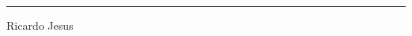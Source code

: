 \documentclass[10pt,landscape]{article}
\makeatletter
\renewcommand{\subsection}{\@startsection{subsection}{2}{0mm}%
                                {-1explus -.5ex minus -.2ex}%
                                {0.5ex plus .2ex}%
                                {\normalfont\normalsize\bfseries}}
\makeatother
\begin{document}
\begin{multicols}{3}
\iffalse
\subsection{Integrais de Funções Hiperbólicas}

$\int \cosh ax\ dx =\frac{1}{a} \sinh ax$\\
$\int \sinh ax\ dx = \frac{1}{a} \cosh ax$\\
$\int  \tanh ax\hspace{1.5pt} dx =\frac{1}{a} \ln \cosh ax$\\
\fi
\rule{0.7\linewidth}{0.25pt}
Ricardo Jesus
\scriptsize


\end{multicols}
\end{document}
